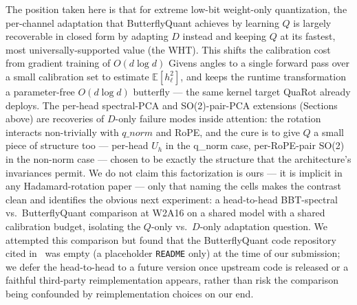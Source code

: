 \documentclass[11pt]{article}
\newcommand{\E}{\mathbb{E}}
\begin{document}
The position taken here is that for extreme low-bit weight-only quantization, the per-channel adaptation that ButterflyQuant achieves by learning $Q$ is largely recoverable in closed form by adapting $D$ instead and keeping $Q$ at its fastest, most universally-supported value (the WHT). This shifts the calibration cost from gradient training of $O(d \log d)$ Givens angles to a single forward pass over a small calibration set to estimate $\E[h_\ell^2]$, and keeps the runtime transformation a parameter-free $O(d \log d)$ butterfly --- the same kernel target QuaRot already deploys. The per-head spectral-PCA and SO(2)-pair-PCA extensions (Sections above) are recoveries of $D$-only failure modes inside attention: the rotation interacts non-trivially with $q\_norm$ and RoPE, and the cure is to give $Q$ a small piece of structure too --- per-head $U_h$ in the q\_norm case, per-RoPE-pair SO(2) in the non-norm case --- chosen to be exactly the structure that the architecture's invariances permit. We do not claim this factorization is ours --- it is implicit in any Hadamard-rotation paper --- only that naming the cells makes the contrast clean and identifies the obvious next experiment: a head-to-head BBT-spectral vs.\ ButterflyQuant comparison at W2A16 on a shared model with a shared calibration budget, isolating the $Q$-only vs.\ $D$-only adaptation question. We attempted this comparison but found that the ButterflyQuant code repository cited in~\cite{xu2025butterflyquant} was empty (a placeholder \texttt{README} only) at the time of our submission; we defer the head-to-head to a future version once upstream code is released or a faithful third-party reimplementation appears, rather than risk the comparison being confounded by reimplementation choices on our end.
\end{document}
